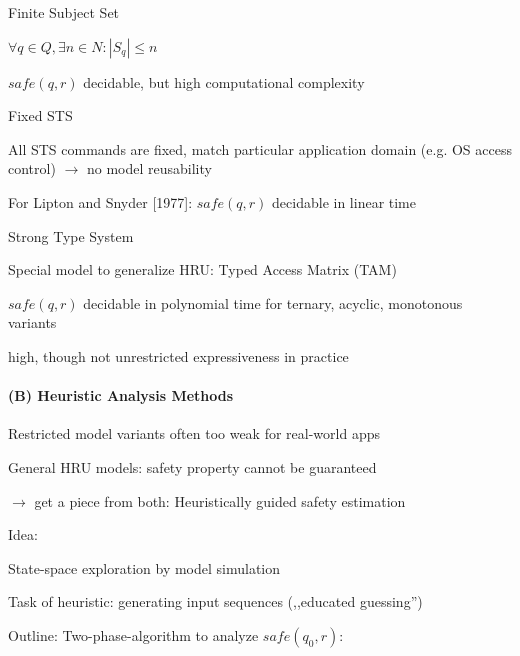 \documentclass[a4paper]{article}
\begin{document}
\begin{multicols}{3}
    Finite Subject Set
    \begin{itemize*}
        \item $\forall q\in Q,\exists n\in N: |S_q|\leq n$
        \item $safe(q,r)$ decidable, but high computational complexity
    \end{itemize*}

    Fixed STS
    \begin{itemize*}
        \item All STS commands are fixed, match particular application domain (e.g. OS access control) $\rightarrow$ no model reusability
        \item For Lipton and Snyder [1977]: $safe(q,r)$ decidable in linear time
    \end{itemize*}

    Strong Type System
    \begin{itemize*}
        \item Special model to generalize HRU: Typed Access Matrix (TAM)
        \item $safe(q,r)$ decidable in polynomial time for ternary, acyclic, monotonous variants
        \item high, though not unrestricted expressiveness in practice
    \end{itemize*}

    \paragraph{(B) Heuristic Analysis Methods}
    \begin{itemize*}
        \item Restricted model variants often too weak for real-world apps
        \item General HRU models: safety property cannot be guaranteed
        \item[$\rightarrow$] get a piece from both: Heuristically guided safety estimation
    \end{itemize*}

    Idea:
    \begin{itemize*}
        \item State-space exploration by model simulation
        \item Task of heuristic: generating input sequences (,,educated guessing'')
    \end{itemize*}

    Outline: Two-phase-algorithm to analyze $safe(q_0,r)$:
    \begin{enumerate*}


\end{enumerate*}
\end{multicols}
\end{document}
